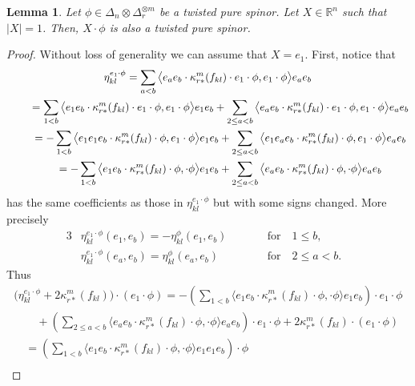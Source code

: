 \documentclass[10pt,a4paper]{amsart}
\numberwithin{equation}{section}
\newtheorem{Lemma}[Theorem]{Lemma}
\begin{document}
\begin{Lemma}\label{lemma: producing more pure spinors} Let $\phi\in\Delta_n\otimes\Delta_r^{\otimes m}$ be a twisted pure spinor. Let $X\in\mathbb{R}^n$ such that $|X|=1$. Then, $X\cdot\phi$ is also a twisted pure spinor.
\end{Lemma}
\begin{proof}\allowdisplaybreaks Without loss of generality we can assume that $X=e_1$. First, notice that
\begin{gather*}
\eta_{kl}^{e_1\cdot\phi}
 = \sum_{a<b} \big\langle e_ae_b\cdot\kappa_{r*}^m(f_{kl})\cdot e_1\cdot\phi,e_1\cdot\phi\big\rangle e_ae_b\\
 \hphantom{\eta_{kl}^{e_1\cdot\phi}}{} = \sum_{1<b} \big\langle e_1e_b\cdot\kappa_{r*}^m(f_{kl})\cdot e_1\cdot\phi,e_1\cdot\phi\big\rangle e_1e_b
 +\sum_{2\leq a<b} \big\langle e_ae_b\cdot\kappa_{r*}^m(f_{kl})\cdot e_1\cdot\phi,e_1\cdot\phi\big\rangle e_ae_b\\
 \hphantom{\eta_{kl}^{e_1\cdot\phi}}{}= -\sum_{1<b} \big\langle e_1e_1e_b\cdot\kappa_{r*}^m(f_{kl})\cdot\phi,e_1\cdot\phi\big\rangle e_1e_b
 +\sum_{2\leq a<b} \big\langle e_1e_ae_b\cdot\kappa_{r*}^m(f_{kl})\cdot\phi,e_1\cdot\phi\big\rangle e_ae_b\\
 \hphantom{\eta_{kl}^{e_1\cdot\phi}}{} = -\sum_{1<b} \big\langle e_1e_b\cdot\kappa_{r*}^m(f_{kl})\cdot\phi,\cdot\phi\big\rangle e_1e_b
 +\sum_{2\leq a<b} \big\langle e_ae_b\cdot\kappa_{r*}^m(f_{kl})\cdot\phi,\cdot\phi\big\rangle e_ae_b
\end{gather*}
has the same coefficients as those in $\eta_{kl}^{e_1\cdot\phi}$ but with some signs changed. More precisely
\begin{alignat*}{3}
&\eta_{kl}^{e_1\cdot\phi}(e_1,e_b) = -\eta_{kl}^{\phi}(e_1,e_b)\qquad&&\text{for} \quad 1\leq b,&\\
& \eta_{kl}^{e_1\cdot\phi}(e_a,e_b) = \eta_{kl}^{\phi}(e_a,e_b)\qquad&& \text{for} \quad 2\leq a<b.&
\end{alignat*}
Thus
\begin{gather*}
\big(\eta_{kl}^{e_1\cdot\phi}+2\kappa_{r*}^m(f_{kl})\big)\cdot (e_1\cdot\phi)
 = -\left(\sum_{1<b} \big\langle e_1e_b\cdot\kappa_{r*}^m(f_{kl})\cdot\phi,\cdot\phi\big\rangle e_1e_b\right)\cdot e_1\cdot\phi\\
 \qquad{} +\left(\sum_{2\leq a<b} \big\langle e_ae_b\cdot\kappa_{r*}^m(f_{kl})\cdot\phi,\cdot\phi\big\rangle e_ae_b\right)\cdot e_1\cdot\phi
 + 2\kappa_{r*}^m(f_{kl})\cdot (e_1\cdot\phi)\\
 \quad{} = \left(\sum_{1<b} \big\langle e_1e_b\cdot\kappa_{r*}^m(f_{kl})\cdot\phi,\cdot\phi\big\rangle e_1e_1e_b\right)\cdot\phi\\

\end{gather*}
\end{proof}
\end{document}
